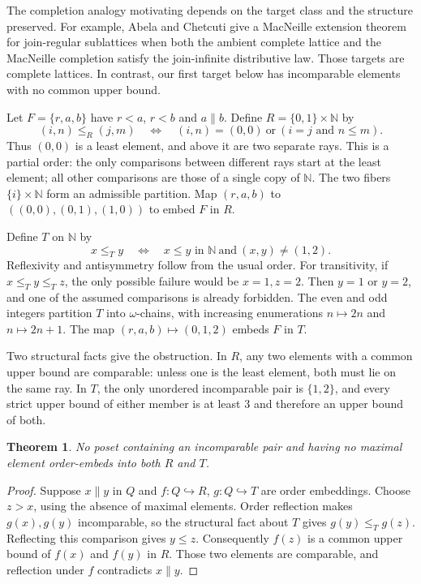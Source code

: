 \documentclass[11pt]{article}
\newtheorem{theorem}{Theorem}
\newcommand{\N}{\mathbb N}
\begin{document}
The completion analogy motivating \cite[Question 2.32]{salinas} depends on
the target class and the structure preserved. For example, Abela and Chetcuti
\cite[Theorem 3.14]{abela} give a MacNeille extension theorem for join-regular
sublattices when both the ambient complete lattice and the MacNeille completion
satisfy the join-infinite distributive law. Those targets are complete lattices.
In contrast, our first target below has incomparable elements with no common
upper bound.

Let $F=\{r,a,b\}$ have $r<a$, $r<b$ and $a\parallel b$. Define
$R=\{0,1\}\times\N$ by
\begin{equation}\label{rays}
 (i,n)\leq_R(j,m)\quad\Longleftrightarrow\quad
 (i,n)=(0,0)\ \text{or}\ (i=j\text{ and }n\leq m).
\end{equation}
Thus $(0,0)$ is a least element, and above it are two separate rays. This is a
partial order: the only comparisons between different rays start at the least
element; all other comparisons are those of a single copy of $\N$.
The two fibers $\{i\}\times\N$ form an admissible partition. Map
$(r,a,b)$ to $((0,0),(0,1),(1,0))$ to embed $F$ in $R$.

Define $T$ on $\N$ by
\begin{equation}\label{tail}
 x\leq_T y\quad\Longleftrightarrow\quad
 x\leq y\text{ in }\N\ \text{and}\ (x,y)\ne(1,2).
\end{equation}
Reflexivity and antisymmetry follow from the usual order. For transitivity,
if $x\leq_T y\leq_T z$, the only possible failure would be $x=1,z=2$.
Then $y=1$ or $y=2$, and one of the assumed comparisons is already forbidden.
The even and odd integers partition $T$ into $\omega$-chains, with increasing
enumerations $n\mapsto2n$ and $n\mapsto2n+1$. The map
$(r,a,b)\mapsto(0,1,2)$ embeds $F$ in $T$.

Two structural facts give the obstruction. In $R$, any two elements with a
common upper bound are comparable: unless one is the least element, both
must lie on the same ray. In $T$, the only unordered incomparable pair is
$\{1,2\}$, and every strict upper bound of either member is at least $3$ and
therefore an upper bound of both.

\begin{theorem}\label{obstruction}
No poset containing an incomparable pair and having no maximal element
order-embeds into both $R$ and $T$.
\end{theorem}
\begin{proof}
Suppose $x\parallel y$ in $Q$ and $f:Q\hookrightarrow R$,
$g:Q\hookrightarrow T$ are order embeddings. Choose $z>x$, using the absence
of maximal elements. Order reflection makes $g(x),g(y)$ incomparable, so the
structural fact about $T$ gives $g(y)\leq_T g(z)$. Reflecting this comparison
gives $y\leq z$. Consequently $f(z)$ is a common upper bound of $f(x)$ and
$f(y)$ in $R$. Those two elements are comparable, and reflection under $f$
contradicts $x\parallel y$.
\end{proof}
\end{document}
